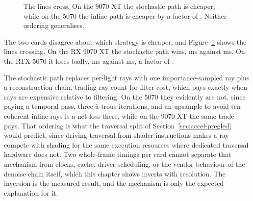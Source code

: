 \begin{figure}[tbp]
\centering
{}
\caption[Shadow strategy cost inverts between vendors]{The lines cross. On the 9070 XT the
stochastic path is cheaper, while on the 5070 the inline path is cheaper by a factor of
\perfShadowRatioNV{}. Neither ordering generalises.}
\label{fig:shadow-strategy}
\end{figure}

The two cards disagree about which strategy is cheaper, and Figure~\ref{fig:shadow-strategy} shows the
lines crossing. On the RX 9070 XT the stochastic path wins,
\perfShadowStochAMD{} ms against \perfShadowInlineAMD{} ms. On the RTX 5070 it loses badly,
\perfShadowStochNV{} ms against \perfShadowInlineNV{} ms, a factor of \perfShadowRatioNV{}.

The stochastic path replaces per-light rays with one importance-sampled ray plus a reconstruction
chain, trading ray count for filter cost, which pays exactly when rays are expensive relative to
filtering. On the 5070 they evidently are not, since paying a temporal pass, three à-trous
iterations, and an upsample to avoid ten coherent inline rays is a net loss there, while on the
9070 XT the same trade pays. That ordering is what the traversal split of
Section~\ref{sec:accel-pregled} would predict, since driving traversal from shader instructions makes
a ray compete with shading for the same execution resources where dedicated traversal hardware does
not. Two whole-frame timings per card cannot separate that mechanism from clocks, cache, driver
scheduling, or the vendor behaviour of the denoise chain itself, which this chapter shows inverts
with resolution. The inversion is the measured result, and the mechanism is only the expected
explanation for it.

